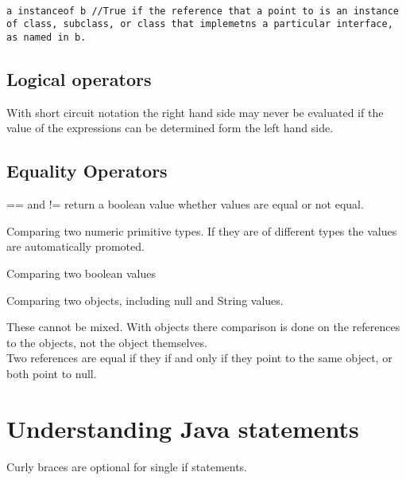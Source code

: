 \documentclass[a4paper]{report}   %
\begin{document}
\begin{lstlisting}

a instanceof b //True if the reference that a point to is an instance of class, subclass, or class that implemetns a particular interface, as named in b.

\end{lstlisting}

\subsection{Logical operators}


With short circuit notation the right hand side may never be evaluated if the value of the expressions can be determined form the left hand side.

\subsection{Equality Operators}

== and != return a boolean value whether values are equal or not equal.

\begin{list}{•}{•}
\item Comparing two numeric primitive types. If they are of different types the values are automatically promoted.
\item Comparing two boolean values
\item Comparing two objects, including null and String values.
\end{list}

These cannot be mixed. With objects there comparison is done on the references to the objects, not the object themselves.\\

Two references are equal if they if and only if they point to the same object, or both point to null.

\section{Understanding Java statements}

Curly braces are optional for single if statements.\\
\end{document}

